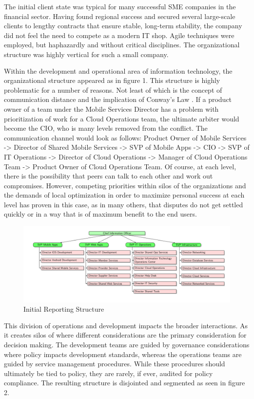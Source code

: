 \documentclass[doc]{apa7}
\begin{document}
The initial client state was typical for many successful SME companies in the financial sector. Having found regional success and secured several large-scale clients to lengthy contracts that ensure stable, long-term stability, the company did not feel the need to compete as a modern IT shop. Agile techniques were employed, but haphazardly and without critical disciplines. The organizational structure was highly vertical for such a small company.

Within the development and operational area of information technology, the organizational structure appeared as in figure 1. This structure is highly problematic for a number of reasons. Not least of which is the concept of communication distance and the implication of Conway's Law \citep{conwayHOWCOMMITTEESINVENT1968}. If a product owner of a team under the Mobile Services Director has a problem with prioritization of work for a Cloud Operations team, the ultimate arbiter would become the CIO, who is many levels removed from the conflict. The communication channel would look as follows: Product Owner of Mobile Services -> Director of Shared Mobile Services -> SVP of Mobile Apps -> CIO -> SVP of IT Operations -> Director of Cloud Operations -> Manager of Cloud Operations Team -> Product Owner of Cloud Operations Team. Of course, at each level, there is the possibility that peers can talk to each other and work out compromises. However, competing priorities within silos of the organizations and the demands of local optimization in order to maximize personal success at each level has proven in this case, as in many others, that disputes do not get settled quickly or in a way that is of maximum benefit to the end users.

\begin{figure}[htbp]
\centering
\includegraphics[width=.9\linewidth]{./diag1.png}
\caption{Initial Reporting Structure}
\end{figure}

This division of operations and development impacts the broader interactions. As it creates silos of where different considerations are the primary consideration for decision making. The development teams are guided by governance considerations where policy impacts development standards, whereas the operations teams are guided by service management procedures. While these procedures should ultimately be tied to policy, they are rarely, if ever, audited for policy compliance. The resulting structure is disjointed and segmented as seen in figure 2.
\end{document}
